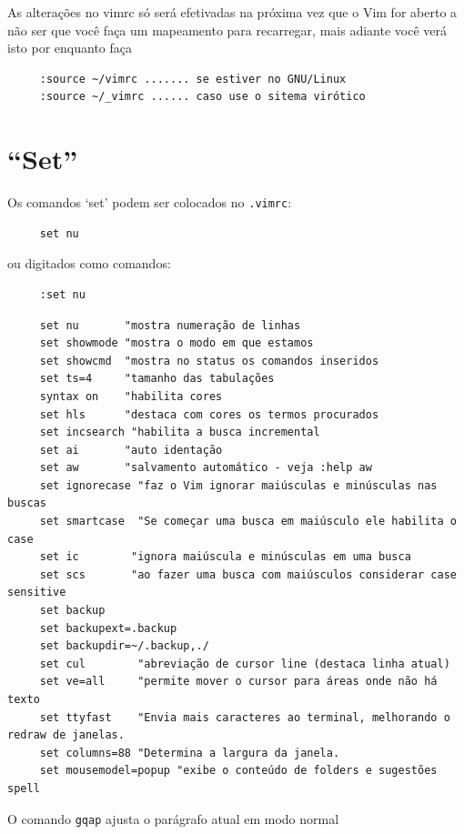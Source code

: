 \documentclass[10pt,a4paper,openany]{book}
\begin{document}
As alterações no vimrc só será efetivadas na próxima vez que o Vim for aberto
a não ser que você faça um mapeamento para recarregar, mais adiante você verá isto
por enquanto faça

\begin{verbatim}
     :source ~/vimrc ....... se estiver no GNU/Linux
     :source ~/_vimrc ...... caso use o sitema virótico
\end{verbatim}

\section{``Set''}
\label{``Set''}
Os comandos `set' podem ser colocados no \verb|.vimrc|:

\begin{verbatim}
     set nu
\end{verbatim}

ou digitados como comandos:

\begin{verbatim}
     :set nu
\end{verbatim}

\begin{verbatim}
     set nu       "mostra numeração de linhas
     set showmode "mostra o modo em que estamos
     set showcmd  "mostra no status os comandos inseridos
     set ts=4     "tamanho das tabulações
     syntax on    "habilita cores
     set hls      "destaca com cores os termos procurados
     set incsearch "habilita a busca incremental
     set ai       "auto identação
     set aw       "salvamento automático - veja :help aw
     set ignorecase "faz o Vim ignorar maiúsculas e minúsculas nas buscas
     set smartcase  "Se começar uma busca em maiúsculo ele habilita o case
     set ic        "ignora maiúscula e minúsculas em uma busca
     set scs       "ao fazer uma busca com maiúsculos considerar case sensitive
     set backup
     set backupext=.backup
     set backupdir=~/.backup,./
     set cul        "abreviação de cursor line (destaca linha atual)
     set ve=all     "permite mover o cursor para áreas onde não há texto
     set ttyfast    "Envia mais caracteres ao terminal, melhorando o redraw de janelas.
     set columns=88 "Determina a largura da janela.
     set mousemodel=popup "exibe o conteúdo de folders e sugestões spell
\end{verbatim}

O comando \verb|gqap| ajusta o parágrafo atual em modo normal
\end{document}

